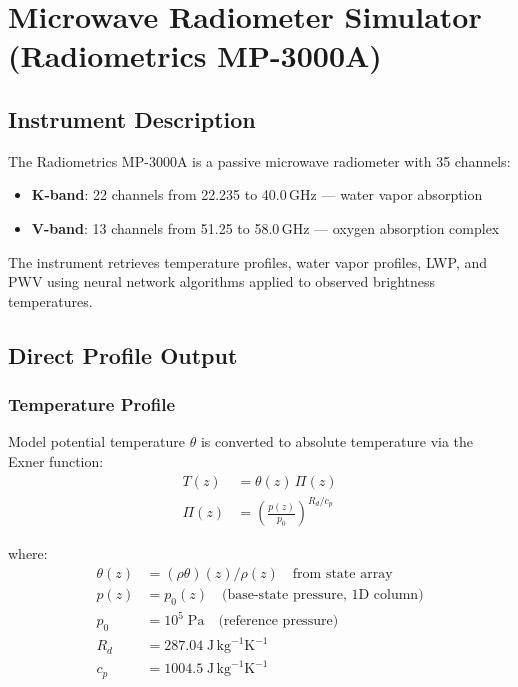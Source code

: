 \documentclass[11pt,letterpaper]{article}
\begin{document}
\section{Microwave Radiometer Simulator (Radiometrics MP-3000A)}

\subsection{Instrument Description}

The Radiometrics MP-3000A is a passive microwave radiometer with 35 channels:
\begin{itemize}
  \item \textbf{K-band}: 22 channels from 22.235 to 40.0\,GHz --- water vapor absorption
  \item \textbf{V-band}: 13 channels from 51.25 to 58.0\,GHz --- oxygen absorption complex
\end{itemize}

The instrument retrieves temperature profiles, water vapor profiles, LWP, and PWV using
neural network algorithms applied to observed brightness temperatures.

\subsection{Direct Profile Output}

\subsubsection{Temperature Profile}

Model potential temperature $\theta$ is converted to absolute temperature via the Exner function:
\begin{align}
  T(z) &= \theta(z)\,\Pi(z) \label{eq:exner_T} \\
  \Pi(z) &= \left(\frac{p(z)}{p_0}\right)^{R_d/c_p} \label{eq:exner}
\end{align}

\noindent where:
\begin{align*}
  \theta(z) &= (\rho\theta)(z) / \rho(z) \quad\text{from state array}\\
  p(z) &= p_0(z) \quad\text{(base-state pressure, 1D column)}\\
  p_0 &= 10^5\;\mathrm{Pa} \quad\text{(reference pressure)}\\
  R_d &= 287.04\;\mathrm{J\,kg}^{-1}\mathrm{K}^{-1} \\
  c_p &= 1004.5\;\mathrm{J\,kg}^{-1}\mathrm{K}^{-1}
\end{align*}
\end{document}
